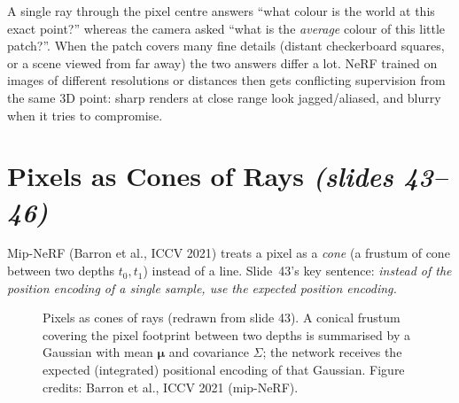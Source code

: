 \documentclass[11pt,a4paper]{article}
\newcommand{\E}{\mathbb{E}}
\newcommand{\sref}[1]{\texorpdfstring{\emph{(slides #1)}}{(slides #1)}}
\theoremstyle{definition}
\theoremstyle{plain}
\begin{document}
\begin{intuition}
A single ray through the pixel centre answers ``what colour is the world at this exact point?'' whereas the camera asked ``what is the \emph{average} colour of this little patch?''. When the patch covers many fine details (distant checkerboard squares, or a scene viewed from far away) the two answers differ a lot. NeRF trained on images of different resolutions or distances then gets conflicting supervision from the same 3D point: sharp renders at close range look jagged/aliased, and blurry when it tries to compromise.
\end{intuition}

\section{Pixels as Cones of Rays \sref{43--46}}

Mip-NeRF (Barron et al., ICCV 2021) treats a pixel as a \emph{cone} (a frustum of cone between two depths $t_0,t_1$) instead of a line. Slide~43's key sentence: \emph{instead of the position encoding of a single sample, use the expected position encoding.}

\begin{figure}[H]
\centering
{}
\caption{Pixels as cones of rays (redrawn from slide 43). A conical frustum covering the pixel footprint between two depths is summarised by a Gaussian with mean $\boldsymbol\mu$ and covariance $\Sigma$; the network receives the expected (integrated) positional encoding of that Gaussian. Figure credits: Barron et al., ICCV 2021 (mip-NeRF).}
\end{figure}
\end{document}
